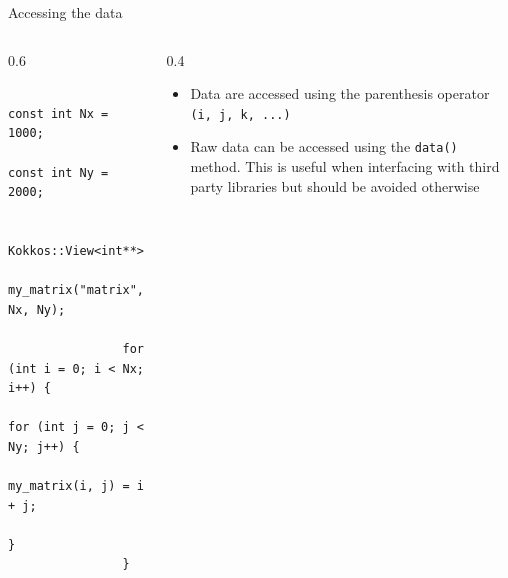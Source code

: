 \documentclass[
    aspectratio=169,
    \createHandout
]{beamer}
\begin{document}
\begin{frame}[fragile]{Accessing the data}
    \begin{columns}
        \begin{column}{0.6\linewidth}
            \begin{verbatim}
                const int Nx = 1000;
                const int Ny = 2000;

                Kokkos::View<int**>
                    my_matrix("matrix", Nx, Ny);

                for (int i = 0; i < Nx; i++) {
                    for (int j = 0; j < Ny; j++) {
                        my_matrix(i, j) = i + j;
                    }
                }
            \end{verbatim}
        \end{column}
        \begin{column}{0.4\linewidth}
            \begin{itemize}
                \item Data are accessed using the parenthesis operator \texttt{(i, j, k, ...)}
                \item Raw data can be accessed using the \texttt{data()} method. This is useful when interfacing with third party libraries but should be avoided otherwise
            \end{itemize}
        \end{column}
    \end{columns}
\end{frame}

\end{document}

